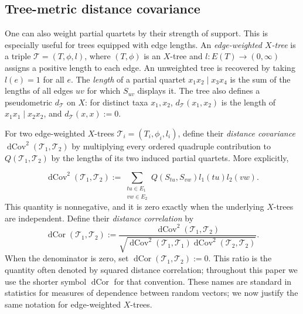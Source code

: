 \documentclass[pdflatex,sn-mathphys-num]{sn-jnl}
\theoremstyle{thmstyleone}
\DeclareMathOperator{\dCov}{dCov}
\DeclareMathOperator{\dCor}{dCor}
\begin{document}
\subsection{Tree-metric distance covariance}

One can also weight partial quartets by their strength of support.  This
is especially useful for trees equipped with edge lengths.  An
\emph{edge-weighted $X$-tree} is a triple $\mathcal T=(T,\phi,l)$, where
$(T,\phi)$ is an $X$-tree and $l:E(T)\to(0,\infty)$ assigns a positive
length to each edge.  An unweighted tree is recovered by taking
$l(e)=1$ for all $e$.  The \emph{length} of a partial quartet
$x_1x_2\mid x_3x_4$ is the sum of the lengths of all edges $uv$ for
which $S_{uv}$ displays it.  The tree also defines a pseudometric
$d_{\mathcal T}$ on $X$: for distinct taxa $x_1,x_2$,
$d_{\mathcal T}(x_1,x_2)$ is the length of
$x_1x_1\mid x_2x_2$, and $d_{\mathcal T}(x,x):=0$.

For two edge-weighted $X$-trees
$\mathcal T_i=(T_i,\phi_i,l_i)$, define their \emph{distance covariance}
$\dCov^2(\mathcal T_1,\mathcal T_2)$ by multiplying every ordered
quadruple contribution to $Q(\mathcal T_1,\mathcal T_2)$ by the lengths
of its two induced partial quartets.  More explicitly,

\[
\dCov^2(\mathcal T_1,\mathcal T_2)
:=\sum_{\substack{tu\in E_1\\vw\in E_2}}
Q(S_{tu},S_{vw})l_1(tu)l_2(vw).
\]
This quantity is nonnegative, and it is zero exactly when the underlying
$X$-trees are independent.  Define their \emph{distance correlation} by
\[
\dCor(\mathcal T_1,\mathcal T_2):=
\frac{\dCov^2(\mathcal T_1,\mathcal T_2)}
{\sqrt{\dCov^2(\mathcal T_1,\mathcal T_1)
\dCov^2(\mathcal T_2,\mathcal T_2)}}.
\]
When the denominator is zero, set
$\dCor(\mathcal T_1,\mathcal T_2):=0$.
This ratio is the quantity often denoted by squared distance correlation;
throughout this paper we use the shorter symbol $\dCor$ for that convention.
These names are standard in statistics for measures of dependence
between random vectors; we now justify the same notation for
edge-weighted $X$-trees.
\end{document}
